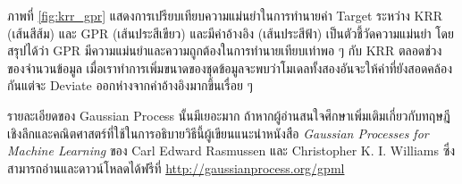 ภาพที่ \ref{fig:krr_gpr} แสดงการเปรียบเทียบความแม่นยำในการทำนายค่า Target ระหว่าง KRR (เส้นสีส้ม) และ GPR (เส้นประสีเขียว) และมีค่าอ้างอิง (เส้นประสีฟ้า) เป็นตัวชี้วัดความแม่นยำ โดยสรุปได้ว่า GPR มีความแม่นยำและความถูกต้องในการทำนายเทียบเท่าพอ ๆ กับ KRR ตลอดช่วงของจำนวนข้อมูล เมื่อเราทำการเพิ่มขนาดของชุดข้อมูลจะพบว่าโมเดลทั้งสองอันจะให้ค่าที่ยังสอดคล้องกันแต่จะ Deviate ออกห่างจากค่าอ้างอิงมากขึ้นเรื่อย ๆ

รายละเอียดของ Gaussian Process นั้นมีเยอะมาก ถ้าหากผู้อ่านสนใจศึกษาเพิ่มเติมเกี่ยวกับทฤษฎีเชิงลึกและคณิตศาสตร์ที่ใช้ในการอธิบายวิธีนี้ผู้เขียนแนะนำหนังสือ \textit{Gaussian Processes for Machine Learning} ของ Carl Edward Rasmussen และ Christopher K. I. Williams ซึ่งสามารถอ่านและดาวน์โหลดได้ฟรีที่ \url{http://gaussianprocess.org/gpml}
